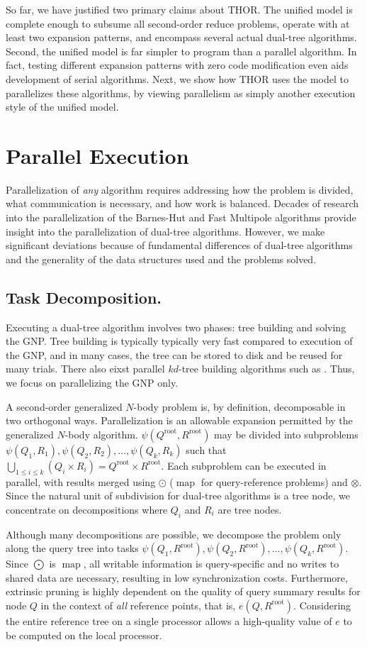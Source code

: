 \documentclass[twoside,leqno,twocolumn]{article}
\newcommand{\Union}{\bigcup}
\DeclareMathOperator*{\map}{map}
\newcommand{\gnp}{\psi}
\newcommand{\mysub}[1]{\subsection{#1.}}
\newcommand{\kdroot}[1]{#1^{\text{root}}}
\newcommand{\lettermu}{e}
\newcommand{\inmu}{e}
\begin{document}
So far, we have justified two primary claims about THOR.
The unified model is complete enough to subsume all second-order reduce problems, operate with at least two expansion patterns, and encompass several actual dual-tree algorithms.
Second, the unified model is far simpler to program than a parallel algorithm.
In fact, testing different expansion patterns with zero code modification even aids development of serial algorithms.
Next, we show how THOR uses the model to parallelizes these algorithms, by viewing parallelism as simply another execution style of the unified model.

\section{Parallel Execution}

Parallelization of {\em any} algorithm requires addressing how the problem is divided, what communication is necessary, and how work is balanced.
Decades of research into the parallelization of the Barnes-Hut and Fast Multipole algorithms provide insight into the parallelization of dual-tree algorithms.
However, we make significant deviations because of fundamental differences of dual-tree algorithms and the generality of the data structures used and the problems solved.

\mysub{Task Decomposition}

Executing a dual-tree algorithm involves two phases: tree building and solving the GNP.
Tree building is typically typically very fast compared to execution of the GNP, and in many cases, the tree can be stored to disk and be reused for many trials.
There also eixst parallel $kd$-tree building algorithms such as \cite{alfuraih00parallel}.
Thus, we focus on parallelizing the GNP only.

A second-order generalized $N$-body problem is, by definition, decomposable in two orthogonal ways.
Parallelization is an allowable expansion permitted by the generalized $N$-body algorithm.
$\gnp(\kdroot{Q}, \kdroot{R})$ may be divided into subproblems $\gnp(Q_1,R_1), \gnp(Q_2,R_2), ..., \gnp(Q_k, R_k)$ such that $\Union_{1 \leq i \leq k} (Q_i \times R_i) = \kdroot{Q} \times \kdroot{R}$.
Each subproblem can be executed in parallel, with results merged using $\odot$ ($\map$ for query-reference problems) and $\otimes$.
Since the natural unit of subdivision for dual-tree algorithms is a tree node, we concentrate on decompositions where $Q_i$ and $R_i$ are tree nodes.

Although many decompositions are possible, we decompose the problem only along the query tree into tasks $\gnp(Q_1, \kdroot{R}), \gnp(Q_2, \kdroot{R}), ..., \gnp(Q_k, \kdroot{R})$.
Since $\bigodot$ is $\map$, all writable information is query-specific and no writes to shared data are necessary, resulting in low synchronization costs.
Furthermore, extrinsic pruning is highly dependent on the quality of query summary results for node $Q$ in the context of {\it all} reference points, that is, $\inmu(Q, \kdroot{R})$.
Considering the entire reference tree on a single processor allows a high-quality value of $\lettermu$ to be computed on the local processor.
\end{document}

